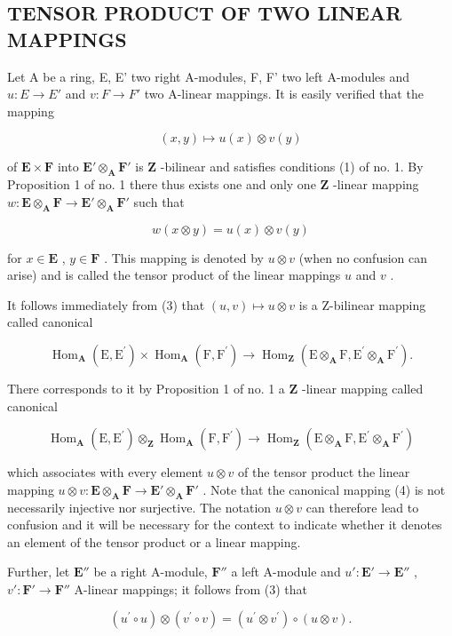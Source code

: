 \subsection{TENSOR PRODUCT OF TWO LINEAR MAPPINGS}

Let A be a ring, E, E' two right A-modules, F, F' two left A-modules and \(u: E \rightarrow E'\) and \(v: F \rightarrow F'\) two A-linear mappings. It is easily verified that the mapping

\[
(x, y) \mapsto u (x) \otimes v (y)
\]

of \(\mathbf{E} \times \mathbf{F}\) into \(\mathbf{E}' \otimes_{\mathbf{A}} \mathbf{F}'\) is \(\mathbf{Z}\) -bilinear and satisfies conditions (1) of no. 1. By Proposition 1 of no. 1 there thus exists one and only one \(\mathbf{Z}\) -linear mapping \(w: \mathbf{E} \otimes_{\mathbf{A}} \mathbf{F} \to \mathbf{E}' \otimes_{\mathbf{A}} \mathbf{F}'\) such that

\[
w (x \otimes y) = u (x) \otimes v (y)\tag{3}
\]

for \(x \in \mathbf{E}\) , \(y \in \mathbf{F}\) . This mapping is denoted by \(u \otimes v\) (when no confusion can arise) and is called the tensor product of the linear mappings \(u\) and \(v\) .

It follows immediately from (3) that \((u, v) \mapsto u \otimes v\) is a Z-bilinear mapping called canonical

\[
\operatorname{Hom} _ {\mathbf {A}} (\mathrm{E}, \mathrm{E} ^ {\prime}) \times \operatorname{Hom} _ {\mathbf {A}} (\mathrm{F}, \mathrm{F} ^ {\prime}) \rightarrow \operatorname{Hom} _ {\mathbf {Z}} (\mathrm{E} \otimes_ {\mathbf {A}} \mathrm{F}, \mathrm{E} ^ {\prime} \otimes_ {\mathbf {A}} \mathrm{F} ^ {\prime}).
\]

There corresponds to it by Proposition 1 of no. 1 a \(\mathbf{Z}\) -linear mapping called canonical

\[
\operatorname{Hom} _ {\mathbf {A}} (\mathrm{E}, \mathrm{E} ^ {\prime}) \otimes_ {\mathbf {Z}} \operatorname{Hom} _ {\mathbf {A}} (\mathrm{F}, \mathrm{F} ^ {\prime}) \rightarrow \operatorname{Hom} _ {\mathbf {Z}} (\mathrm{E} \otimes_ {\mathbf {A}} \mathrm{F}, \mathrm{E} ^ {\prime} \otimes_ {\mathbf {A}} \mathrm{F} ^ {\prime})\tag{4}
\]

which associates with every element \(u \otimes v\) of the tensor product the linear mapping \(u \otimes v: \mathbf{E} \otimes_{\mathbf{A}} \mathbf{F} \to \mathbf{E}' \otimes_{\mathbf{A}} \mathbf{F}'\) . Note that the canonical mapping (4) is not necessarily injective nor surjective. The notation \(u \otimes v\) can therefore lead to confusion and it will be necessary for the context to indicate whether it denotes an element of the tensor product or a linear mapping.

Further, let \(\mathbf{E}''\) be a right A-module, \(\mathbf{F}''\) a left A-module and \(u':\mathbf{E}'\to\mathbf{E}''\) , \(v':\mathbf{F}'\to\mathbf{F}''\) A-linear mappings; it follows from (3) that

\[
\left(u ^ {\prime} \circ u\right) \otimes \left(v ^ {\prime} \circ v\right) = \left(u ^ {\prime} \otimes v ^ {\prime}\right) \circ (u \otimes v).\tag{5}
\]
\relax{}
